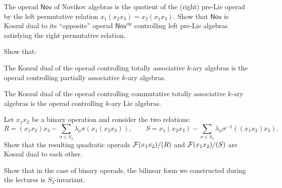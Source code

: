 \begin{question} 
The operad $\mathsf{Nov}$ of Novikov algebras
is the quotient of the (right) pre-Lie operad by the 
left permutative relation
$x_1(x_2x_3) = x_2(x_1x_3)$.
Show that $\mathsf{Nov}$ is Koszul dual to its
``opposite'' operad $\mathsf{Nov}^\mathrm{op}$
controlling left pre-Lie algebras satisfying the
right permutative relation. 
\end{question}

\begin{question}
Show that:
\begin{tenumerate}
\item 
The Koszul dual of the operad controlling
totally associative $k$-ary algebras is the
operad controlling partially associative
$k$-ary algebras.
\item The Koszul dual of the operad controlling
commutative totally associative $k$-ary algebras
is the operad controlling $k$-ary Lie algebras. 
\end{tenumerate}
\end{question}

\begin{question}
Let $x_1x_2$ be a binary operation and consider
the two relations:
\[
  R = (x_1x_2)x_3 -
   	\sum_{\sigma \in S_3} 
   		\lambda_\sigma \sigma(x_1(x_2x_3)),
   		\qquad
   		S = x_1(x_2x_3) - 
   	\sum_{\sigma \in S_3} 
   		\lambda_\sigma \sigma^{-1}((x_1x_2)x_3).
 	\]
Show that the resulting quadratic operads $\mathcal{F}(x_1x_2)/(R)$
and $\mathcal{F}(x_1x_2)/(S)$ are Koszul dual to each other.
\end{question}

\begin{question}
Show that in the case of binary operads,
the bilinear form we constructed 
during the lectures is $S_3$-invariant.
\end{question}
